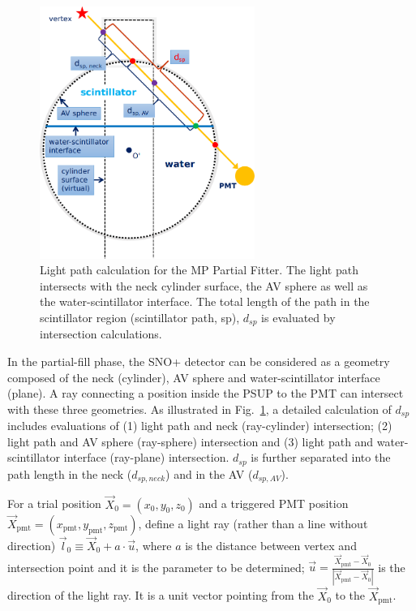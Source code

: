 \begin{figure}[!htb]
	\centering
	\includegraphics[width=7cm]{scintpath.png}
	\caption{Light path calculation for the MP Partial Fitter. The light path intersects with the neck cylinder surface, the AV sphere as well as the water-scintillator interface. The total length of the path in the scintillator region (scintillator path, sp), $d_{sp}$ is evaluated by intersection calculations.}
	\label{scintpath}
\end{figure}

In the partial-fill phase, the SNO+ detector can be considered as a geometry composed of the neck (cylinder), AV sphere and water-scintillator interface (plane). A ray connecting a position inside the PSUP to the PMT can intersect with these three geometries. As illustrated in Fig.~\ref{scintpath}, a detailed calculation of $d_{sp}$ includes evaluations of (1) light path and neck (ray-cylinder) intersection; (2) light path and AV sphere (ray-sphere) intersection and (3) light path and water-scintillator interface (ray-plane) intersection. $d_{sp}$ is further separated into the path length in the neck ($d_{sp,neck}$) and in the AV ($d_{sp,AV}$). 

For a trial position $\vec{X}_0=(x_0,y_0,z_0)$ and a triggered PMT position $\vec{X}_{\mathrm{pmt}}=(x_\mathrm{pmt},y_\mathrm{pmt},z_\mathrm{pmt})$, define a light ray (rather than a line without direction) $\vec{l}_0\equiv\vec{X}_0+a\cdot \vec{u}$, where $a$ is the distance between vertex and intersection point and it is the parameter to be determined; $\vec u=\frac{\vec{X}_{\mathrm{pmt}}-\vec{X}_0}{|\vec{X}_{\mathrm{pmt}}-\vec{X}_0|}$ is the direction of the light ray. It is a unit vector pointing from the $\vec{X}_0$ to the $\vec{X}_{\mathrm{pmt}}$.

